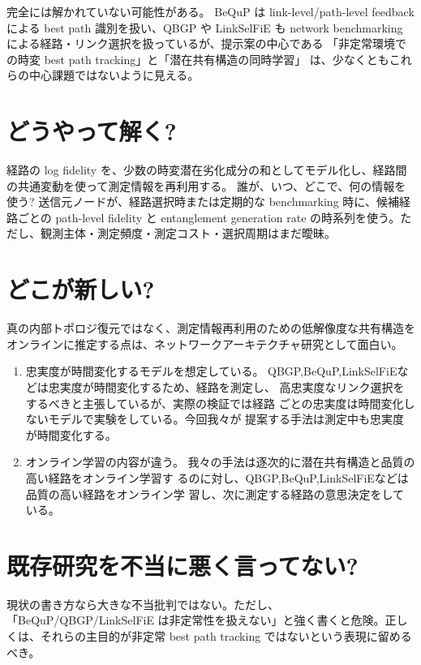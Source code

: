 \documentclass[conference]{IEEEtran}
\begin{document}
完全には解かれていない可能性がある。 BeQuP は link-level/path-level
feedback による best path 識別を扱い、QBGP や LinkSelFiE も network
benchmarking による経路・リンク選択を扱っているが、提示案の中心である
「非定常環境での時変 best path tracking」と「潜在共有構造の同時学習」
は、少なくともこれらの中心課題ではないように見える。

\section{どうやって解く?}
\label{sec:org710eb86}
経路の log fidelity を、少数の時変潜在劣化成分の和としてモデル化し、経路間の共通変動を使って測定情報を再利用する。
誰が、いつ、どこで、何の情報を使う?
送信元ノードが、経路選択時または定期的な benchmarking 時に、候補経路ごとの path-level fidelity と entanglement generation rate の時系列を使う。ただし、観測主体・測定頻度・測定コスト・選択周期はまだ曖昧。

\section{どこが新しい?}
\label{sec:orgd23c462}
真の内部トポロジ復元ではなく、測定情報再利用のための低解像度な共有構造をオンラインに推定する点は、ネットワークアーキテクチャ研究として面白い。

\begin{enumerate}
\item 忠実度が時間変化するモデルを想定している。
QBGP,BeQuP,LinkSelFiEなどは忠実度が時間変化するため、経路を測定し、
高忠実度なリンク選択をするべきと主張しているが、実際の検証では経路
ごとの忠実度は時間変化しないモデルで実験をしている。今回我々が
提案する手法は測定中も忠実度が時間変化する。

\item オンライン学習の内容が違う。
我々の手法は逐次的に潜在共有構造と品質の高い経路をオンライン学習す
るのに対し、QBGP,BeQuP,LinkSelFiEなどは品質の高い経路をオンライン学
習し、次に測定する経路の意思決定をしている。
\end{enumerate}


\section{既存研究を不当に悪く言ってない?}
\label{sec:org2f9b791}
現状の書き方なら大きな不当批判ではない。ただし、「BeQuP/QBGP/LinkSelFiE は非定常性を扱えない」と強く書くと危険。正しくは、それらの主目的が非定常 best path tracking ではないという表現に留めるべき。
\end{document}
